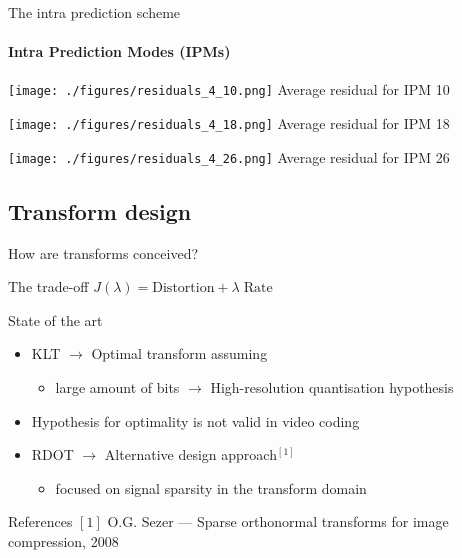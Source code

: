 \documentclass[10pt]{beamer} %
\begin{document}
\begin{frame}{The intra prediction scheme}
	\framesubtitle{Intra Prediction Modes (IPMs)}
	\begin{minipage}{0.48\textwidth}
		
	\end{minipage}
	\begin{minipage}{0.48\textwidth}
		\texttt{[image: ./figures/residuals\_4\_10.png]}
		\hfill \small Average residual for IPM 10

		\vspace{1em}

		\texttt{[image: ./figures/residuals\_4\_18.png]}
		\hfill \small Average residual for IPM 18

		\vspace{1em}

		\texttt{[image: ./figures/residuals\_4\_26.png]}
		\hfill \small Average residual for IPM 26
	\end{minipage}
\end{frame}

\subsection{Transform design}

\begin{frame}{How are transforms conceived?}
	\begin{block}{The trade-off}
		$J(\lambda) = \text{Distortion} + \lambda \; \text{Rate}$
	\end{block}
	\begin{block}{State of the art}
		\begin{itemize}
			\item KLT $\to$ Optimal transform assuming
				\begin{itemize}
					\item large amount of bits $\to$ High-resolution
						quantisation hypothesis
				\end{itemize}
			\item Hypothesis for optimality is not valid in video
				coding
			\item RDOT $\to$ Alternative design approach$^{[1]}$
				\begin{itemize}
					\item focused on signal sparsity in the transform domain
				\end{itemize}
		\end{itemize}
	\end{block}
	\begin{block}{References}
		\scriptsize
		$[1]$ O.G. Sezer --- Sparse orthonormal transforms for image
		compression, 2008\\
	\end{block}
\end{frame}
\end{document}

